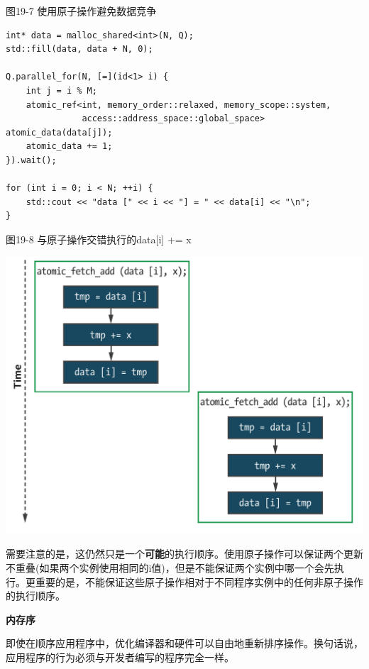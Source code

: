 \hspace*{\fill} \par %
图19-7 使用原子操作避免数据竞争
\begin{lstlisting}[caption={}]
int* data = malloc_shared<int>(N, Q);
std::fill(data, data + N, 0);

Q.parallel_for(N, [=](id<1> i) {
	int j = i % M;
	atomic_ref<int, memory_order::relaxed, memory_scope::system,
			   access::address_space::global_space> atomic_data(data[j]);
	atomic_data += 1;
}).wait();

for (int i = 0; i < N; ++i) {
	std::cout << "data [" << i << "] = " << data[i] << "\n";
}
\end{lstlisting}

\hspace*{\fill} \par %
图19-8 与原子操作交错执行的data[i] += x
\begin{center}
	\includegraphics[width=1.0\textwidth]{content/chapter-19/images/5}
\end{center}

需要注意的是，这仍然只是一个\textbf{可能}的执行顺序。使用原子操作可以保证两个更新不重叠(如果两个实例使用相同的i值)，但是不能保证两个实例中哪一个会先执行。更重要的是，不能保证这些原子操作相对于不同程序实例中的任何非原子操作的执行顺序。\par

\hspace*{\fill} \par %
\textbf{内存序}

即使在顺序应用程序中，优化编译器和硬件可以自由地重新排序操作。换句话说，应用程序的行为必须与开发者编写的程序完全一样。\par

